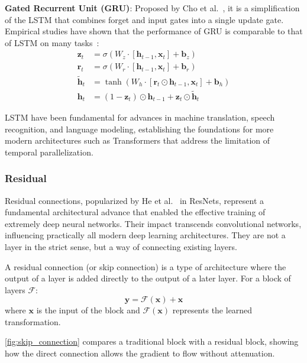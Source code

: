 \textbf{Gated Recurrent Unit (GRU)}: Proposed by Cho et al.~\citep{cho2014learning}, it is a simplification of the \gls{LSTM} that combines forget and input gates into a single update gate. Empirical studies have shown that the performance of \gls{GRU} is comparable to that of \gls{LSTM} on many tasks~\citep{chung2014empirical}:
\begin{align}
\mathbf{z}_t &= \sigma(W_z \cdot [\mathbf{h}_{t-1}, \mathbf{x}_t] + \mathbf{b}_z) \\
\mathbf{r}_t &= \sigma(W_r \cdot [\mathbf{h}_{t-1}, \mathbf{x}_t] + \mathbf{b}_r) \\
\tilde{\mathbf{h}}_t &= \tanh(W_h \cdot [\mathbf{r}_t \odot \mathbf{h}_{t-1}, \mathbf{x}_t] + \mathbf{b}_h) \\
\mathbf{h}_t &= (1 - \mathbf{z}_t) \odot \mathbf{h}_{t-1} + \mathbf{z}_t \odot \tilde{\mathbf{h}}_t
\end{align}

\gls{LSTM} have been fundamental for advances in machine translation, speech recognition, and language modeling, establishing the foundations for more modern architectures such as \glspl{Transformer} that address the limitation of temporal parallelization.

\subsubsection{Residual}

Residual connections, popularized by He et al.~\citep{he2016deep} in ResNets, represent a fundamental architectural advance that enabled the effective training of extremely deep neural networks. Their impact transcends convolutional networks, influencing practically all modern deep learning architectures. They are not a layer in the strict sense, but a way of connecting existing layers.

\begin{definition}\label{def:conexion_residual}
	A residual connection (or skip connection) is a type of architecture where the output of a layer is added directly to the output of a later layer. For a block of layers $\mathcal{F}$:
	\[
	\mathbf{y} = \mathcal{F}(\mathbf{x}) + \mathbf{x}
	\]
	where $\mathbf{x}$ is the input of the block and $\mathcal{F}(\mathbf{x})$ represents the learned transformation.
\end{definition}

\autoref{fig:skip_connection} compares a traditional block with a residual block, showing how the direct connection allows the gradient to flow without attenuation.


